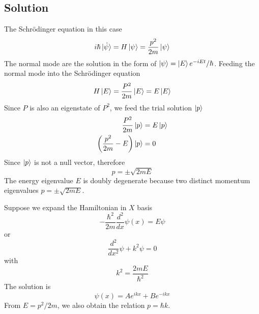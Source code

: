 \documentclass[../../../main.tex]{subfiles}
\begin{document}
\subsection{Solution}
The Schrödinger equation in this case
\begin{equation*}
    i \hbar \ket{\dot{\psi}}=H \ket{\psi}=\frac{p^2 }{2m }\ket{\psi}
\end{equation*}
The normal mode are the solution in the form of $\ket{\psi }= \ket{E }e^{-iE t}/\hbar$.
Feeding the normal mode into the Schrödinger equation
\begin{equation*}
    H \ket{E}=\frac{P^2 }{2m }\ket{E}=E \ket{E}
\end{equation*}
Since $P$ is also an eigenstate of $P^2 $, we feed the trial solution $\ket{p}$
\begin{align*}
    \frac{P^2 }{2m }\ket{p }                    & =  E \ket{p } \\
    \left( \frac{p^2 }{2m }-E  \right) \ket{p } & = 0
\end{align*}
Since $\ket{p}$ is not a null vector, therefore
\begin{equation*}
    p=\pm \sqrt{2mE}
\end{equation*}
The energy eigenvalue $E$ is doubly degenerate because two distinct momentum eigenvalues $p=\pm \sqrt{2mE}$.

Suppose we expand the Hamiltonian in $X$ basis
\begin{equation*}
    -\frac{\hbar^2 }{2m }\frac{d^2 }{dx } \psi(x)=E\psi
\end{equation*}
or
\begin{equation*}
    \frac{d^2 }{dx^2}\psi+k^2\psi=0
\end{equation*}
with
\begin{equation*}
    k^2=\frac{2mE }{\hbar^2}
\end{equation*}
The solution is
\begin{equation*}
    \psi(x)=Ae^{ikx}+Be^{-ikx}
\end{equation*}
From $E=p^2/2m$, we also obtain the relation $p=\hbar k$.
\end{document}
